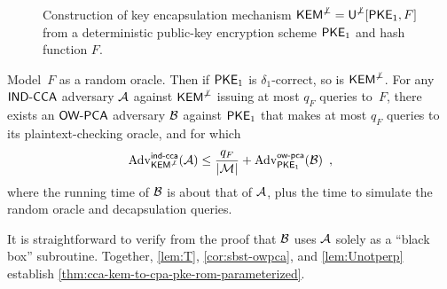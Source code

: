 \documentclass{iacrcc}
\begin{document}
\begin{figure}[h]
\centering
{}
\caption{Construction of key encapsulation mechanism $\textsf{\upshape\mdseries KEM}^{\not\perp}=\textsf{\upshape\mdseries U}^{\not\perp}[\textsf{\upshape\mdseries PKE}_1, F]$ from a deterministic public-key encryption scheme $\textsf{\upshape\mdseries PKE}_1$ and hash function $F$.}
\label{fig:Unotperp}
\end{figure}

\begin{lemma}
  \label{lem:Unotperp}
  Model~$F$ as a random oracle.  Then if $\textsf{\upshape\mdseries PKE}_1$ is
  $\delta_1$-correct, so is $\textsf{\upshape\mdseries KEM}^{\not\perp}$.  For any $\textsf{\upshape\mdseries IND-CCA}$
  adversary $\mathcal{A}$ against $\textsf{\upshape\mdseries KEM}^{\not\perp}$ issuing at
  most $q_F$ queries to~$F$, there exists an $\textsf{\upshape\mdseries OW-PCA}$ adversary
  $\mathcal{B}$ against $\textsf{\upshape\mdseries PKE}_1$ that makes at most $q_F$ queries to
  its plaintext-checking oracle, and for which
  \[
    \mathrm{Adv}^{\textsf{\upshape\mdseries \textsf{\upshape\mdseries ind-cca}}}_{\textsf{\upshape\mdseries KEM}^{\not\perp}}(\mathcal{A}) \leq \frac{q_F}{|\mathcal{M}|} +
    \mathrm{Adv}^{\textsf{\upshape\mdseries \textsf{\upshape\mdseries ow-pca}}}_{\textsf{\upshape\mdseries PKE}_1}(\mathcal{B}) \enspace ,
  \]
  where the running time of $\mathcal{B}$ is about that of
  $\mathcal{A}$, plus the time to simulate the random oracle and
  decapsulation queries.
\end{lemma}

It is straightforward to verify from the proof that $\mathcal{B}$ uses
$\mathcal{A}$ solely as a ``black box'' subroutine.  Together,
\autoref{lem:T}, \autoref{cor:sbst-owpca}, and \autoref{lem:Unotperp}
establish \autoref{thm:cca-kem-to-cpa-pke-rom-parameterized}.
\end{document}
